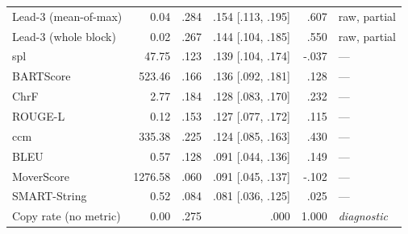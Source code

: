 \begin{table}[t]
\begin{tabular}{@{}lrrrrl@{}}
Lead-3 (mean-of-max) & 0.04 & .284 & .154 {\scriptsize [.113, .195]} & .607 & raw, partial \\
Lead-3 (whole block) & 0.02 & .267 & .144 {\scriptsize [.104, .185]} & .550 & raw, partial \\
spl & 47.75 & .123 & .139 {\scriptsize [.104, .174]} & -.037 & --- \\
BARTScore & 523.46 & .166 & .136 {\scriptsize [.092, .181]} & .128 & --- \\
ChrF & 2.77 & .184 & .128 {\scriptsize [.083, .170]} & .232 & --- \\
ROUGE-L & 0.12 & .153 & .127 {\scriptsize [.077, .172]} & .115 & --- \\
ccm & 335.38 & .225 & .124 {\scriptsize [.085, .163]} & .430 & --- \\
BLEU & 0.57 & .128 & .091 {\scriptsize [.044, .136]} & .149 & --- \\
MoverScore & 1276.58 & .060 & .091 {\scriptsize [.045, .137]} & -.102 & --- \\
SMART-String & 0.52 & .084 & .081 {\scriptsize [.036, .125]} & .025 & --- \\
\midrule
Copy rate (no metric) & 0.00 & .275 & .000 & 1.000 & \emph{diagnostic} \\
\bottomrule
\end{tabular}
\end{table}
